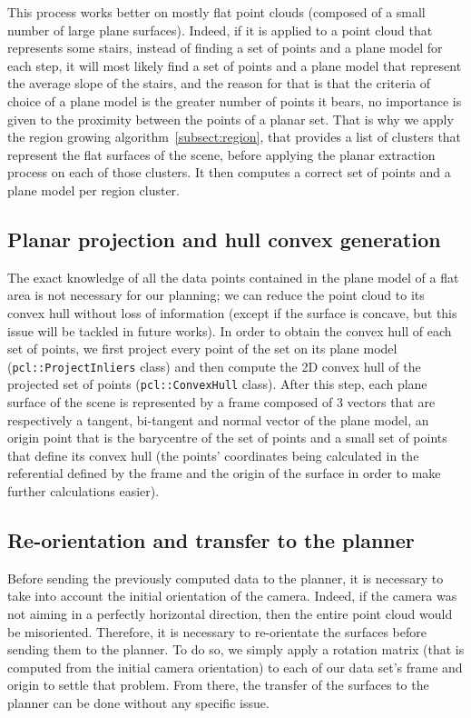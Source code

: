 This process works better on mostly flat point clouds (composed of a small number of large plane surfaces). Indeed, if it is applied to a point cloud that represents some stairs, instead of finding a set of points and a plane model for each step, it will most likely find a set of points and a plane model that represent the average slope of the stairs, and the reason for that is that the criteria of choice of a plane model is the greater number of points it bears, no importance is given to the proximity between the points of a planar set. That is why we apply the region growing algorithm~\ref{subsect:region}, that provides a list of clusters that represent the flat surfaces of the scene, before applying the planar extraction process on each of those clusters. 
It then computes a correct set of points and a plane model per region cluster.

\subsection{Planar projection and hull convex generation}
\label{subsect:PlanProjection}

The exact knowledge of all the data points contained in the plane model of a flat area is not necessary for our planning; we can reduce the point cloud to its convex hull without loss of information (except if the surface is concave, but this issue will be tackled in future works). In order to obtain the convex hull of each set of points, we first project every point of the set on its plane model ({\tt pcl::ProjectInliers} class) and then compute the 2D convex hull of the projected set of points ({\tt pcl::ConvexHull} class). After this step, each plane surface of the scene is represented by a frame composed of 3 vectors that are respectively a tangent, bi-tangent and normal vector of the plane model, an origin point that is the barycentre of the set of points and a small set of points that define its convex hull (the points' coordinates being calculated in the referential defined by the frame and the origin of the surface in order to make further calculations easier).

\subsection{Re-orientation and transfer to the planner}
\label{subsect:reorient}

Before sending the previously computed data to the planner, it is necessary to take into account the initial orientation of the camera. Indeed, if the camera was not aiming in a perfectly horizontal direction, then the entire point cloud would be misoriented. Therefore, it is necessary to re-orientate the surfaces before sending them to the planner. To do so, we simply apply a rotation matrix (that is computed from the initial camera orientation) to each of our data set's frame and origin to settle that problem. From there, the transfer of the surfaces to the planner can be done without any specific issue.

